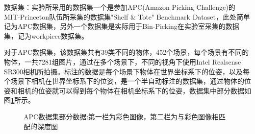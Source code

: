 {\kai 数据集}：实验所采用的数据集一个是参加APC(Amazon Picking Challenge)的MIT-Princeton队伍所采集的数据集"Shelf \& Tote" Benchmark Dataset\cite{apcdataset}，此处简单记为APC数据集，另外一个数据集是实际用于Bin-Picking在实验室采集的数据集，记为workpiece数据集。

对于APC数据集，该数据集共有39类不同的物体，452个场景，每个场景有不同的物体，一共7281组图片，通过在多个场景下，不同的视角下使用Intel Realsense SR300相机所拍摄。标注的数据是每个场景下物体在世界坐标系下的位姿，以及每个场景下相机在世界坐标系下的位姿，是一个半自动标注的数据集，通过物体的位姿和相机的位姿就可以得到每个物体在相机坐标系下的位姿，数据集中部分数据如图\ref{fig:apc_dataset}所示。
\begin{figure}[ht]
  \centering
  \hskip0.2cm
  \hskip0.2cm
  \hskip0.2cm
  \vfill
  \hskip0.2cm
  \hskip0.2cm
  \hskip0.2cm
  \caption{APC数据集部分数据:第一栏为彩色图像，第二栏为与彩色图像相匹配的深度图}
  \label{fig:apc_dataset}
\end{figure}

